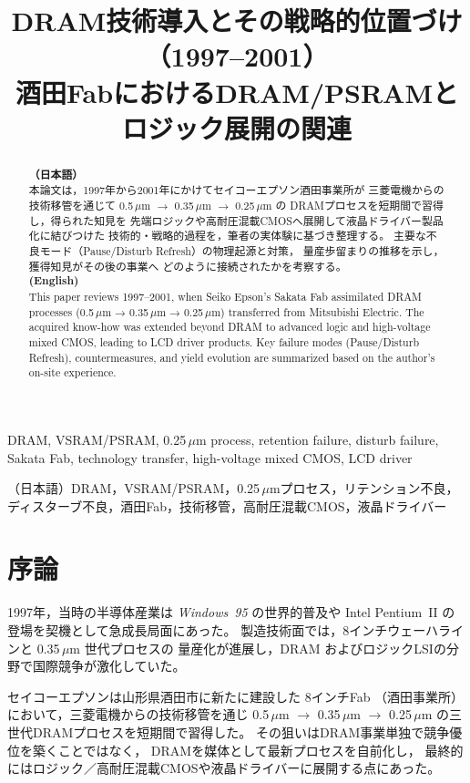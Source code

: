 \documentclass[conference]{IEEEtran}
\title{DRAM技術導入とその戦略的位置づけ（1997--2001）\\
\large 酒田FabにおけるDRAM/PSRAMとロジック展開の関連}
\author{%
  \IEEEauthorblockN{三溝 真一 (Shinichi Samizo)}%
  \IEEEauthorblockA{独立系半導体研究者（元セイコーエプソン）\\%
  Independent Semiconductor Researcher (ex-Seiko Epson)\\%
  Email: \href{mailto:shin3t72@gmail.com}{shin3t72@gmail.com}\\%
  GitHub: \url{https://github.com/Samizo-AITL}}%
}
\begin{document}
\maketitle

\begin{abstract}
\textbf{（日本語）}\\
本論文は，1997年から2001年にかけてセイコーエプソン酒田事業所が
三菱電機からの技術移管を通じて \mbox{0.5\,$\mu$m} $\rightarrow$ \mbox{0.35\,$\mu$m} $\rightarrow$ \mbox{0.25\,$\mu$m} の
DRAMプロセスを短期間で習得し，得られた知見を
先端ロジックや高耐圧混載CMOSへ展開して液晶ドライバー製品化に結びつけた
技術的・戦略的過程を，筆者の実体験に基づき整理する。
主要な不良モード（Pause/Disturb Refresh）の物理起源と対策，
量産歩留まりの推移を示し，獲得知見がその後の事業へ
どのように接続されたかを考察する。\\[1ex]

\textbf{(English)}\\
This paper reviews 1997–2001, when Seiko Epson’s Sakata Fab
assimilated DRAM processes (0.5\,$\mu$m → 0.35\,$\mu$m → 0.25\,$\mu$m) transferred from Mitsubishi Electric.
The acquired know-how was extended beyond DRAM to advanced logic
and high-voltage mixed CMOS, leading to LCD driver products.
Key failure modes (Pause/Disturb Refresh), countermeasures, and yield evolution
are summarized based on the author’s on-site experience.
\end{abstract}

\begin{IEEEkeywords}
DRAM, VSRAM/PSRAM, 0.25\,$\mu$m process, retention failure, disturb failure, Sakata Fab, technology transfer, high-voltage mixed CMOS, LCD driver

\hspace{1em}（日本語）DRAM，VSRAM/PSRAM，0.25\,$\mu$mプロセス，リテンション不良，ディスターブ不良，酒田Fab，技術移管，高耐圧混載CMOS，液晶ドライバー
\end{IEEEkeywords}

\section{序論}
1997年，当時の半導体産業は \textit{Windows~95} の世界的普及や
Intel Pentium~II の登場を契機として急成長局面にあった。
製造技術面では，8インチウェーハラインと 0.35\,$\mu$m 世代プロセスの
量産化が進展し，DRAM およびロジックLSIの分野で国際競争が激化していた。

セイコーエプソンは山形県酒田市に新たに建設した 8インチFab
（酒田事業所）において，三菱電機からの技術移管を通じ
0.5\,$\mu$m $\rightarrow$ 0.35\,$\mu$m $\rightarrow$ 0.25\,$\mu$m
の三世代DRAMプロセスを短期間で習得した。
その狙いはDRAM事業単独で競争優位を築くことではなく，
DRAMを媒体として最新プロセスを自前化し，
最終的にはロジック／高耐圧混載CMOSや液晶ドライバーに展開する点にあった。
\end{document}
